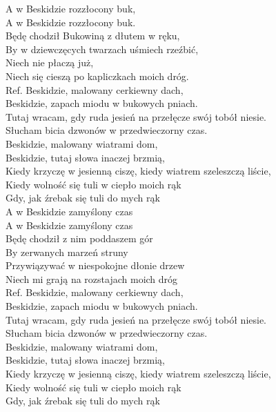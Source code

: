 
A w Beskidzie rozzłocony buk, \tab{}\\
A w Beskidzie rozzłocony buk. \tab{}\\
Będę chodził Bukowiną z dłutem w ręku,\tab{} \\
By w dziewczęcych twarzach uśmiech rzeźbić, \tab{}\\
Niech nie płaczą już, \tab{}\tab{}\\
Niech się cieszą po kapliczkach moich dróg. \tab{} \\
\hops
Ref. Beskidzie, malowany cerkiewny dach,\tab{}\tab{} \\
 Beskidzie, zapach miodu w bukowych pniach. \tab{}\\
 Tutaj wracam, gdy ruda jesień na przełęcze swój tobół niesie. \\
 Słucham bicia dzwonów w przedwieczorny czas. \tab{}\\
 Beskidzie, malowany wiatrami dom,  \tab{}\tab{}\\
 Beskidzie, tutaj słowa inaczej brzmią, \tab{}\tab{}\\
 Kiedy krzyczę w jesienną ciszę, kiedy wiatrem szeleszczą liście,  \\
 Kiedy wolność się tuli w ciepło moich rąk \tab{}\\
 Gdy, jak źrebak się tuli do mych rąk \tab{}\tab{}\\
\hops
A w Beskidzie zamyślony czas \\
A w Beskidzie zamyślony czas \\
Będę chodził z nim poddaszem gór \\
By zerwanych marzeń struny \\
Przywiązywać w niespokojne dłonie drzew \\
Niech mi grają na rozstajach moich dróg \\
\hops
Ref. Beskidzie, malowany cerkiewny dach, \\
 Beskidzie, zapach miodu w bukowych pniach. \\
 Tutaj wracam, gdy ruda jesień na przełęcze swój tobół niesie. \\
 Słucham bicia dzwonów w przedwieczorny czas. \\
 Beskidzie, malowany wiatrami dom, \\
 Beskidzie, tutaj słowa inaczej brzmią, \\
 Kiedy krzyczę w jesienną ciszę, kiedy wiatrem szeleszczą liście, \\
 Kiedy wolność się tuli w ciepło moich rąk \\
 Gdy, jak źrebak się tuli do mych rąk